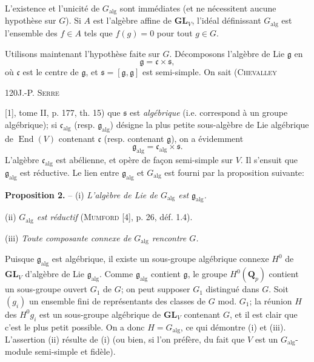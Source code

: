 L'existence et l'unicité de $G_{\mathrm{alg}}$ sont immédiates (et ne nécessitent aucune hypothèse sur $G$). Si $A$ est l'algèbre affine de $\mathbf{GL}_V$, l'idéal définissant $G_{\mathrm{alg}}$ est l'ensemble des $f\in A$ tels que $f(g)=0$ pour tout $g\in G$.

Utilisons maintenant l'hypothèse faite sur $G$. Décomposons l'algèbre de Lie $\mathfrak g$ en
\[
\mathfrak g=\mathfrak c\times\mathfrak s,
\]
où $\mathfrak c$ est le centre de $\mathfrak g$, et $\mathfrak s=[\mathfrak g,\mathfrak g]$ est semi-simple. On sait (\textsc{Chevalley}

120\hfill J.-P. \textsc{Serre}

[1], tome II, p. 177, th. 15) que $\mathfrak s$ est \textit{algébrique} (i.e. correspond à un groupe algébrique); si $\mathfrak c_{\mathrm{alg}}$ (resp. $\mathfrak g_{\mathrm{alg}}$) désigne la plus petite sous-algèbre de Lie algébrique de $\operatorname{End}(V)$ contenant $\mathfrak c$ (resp. contenant $\mathfrak g$), on a évidemment
\[
\mathfrak g_{\mathrm{alg}}=\mathfrak c_{\mathrm{alg}}\times\mathfrak s.
\]
L'algèbre $\mathfrak c_{\mathrm{alg}}$ est abélienne, et opère de façon semi-simple sur $V$. Il s'ensuit que $\mathfrak g_{\mathrm{alg}}$ est réductive. Le lien entre $\mathfrak g_{\mathrm{alg}}$ et $G_{\mathrm{alg}}$ est fourni par la proposition suivante:

\textbf{Proposition 2.} -- (i) \textit{L'algèbre de Lie de $G_{\mathrm{alg}}$ est $\mathfrak g_{\mathrm{alg}}$.}

(ii) \textit{$G_{\mathrm{alg}}$ est réductif} (\textsc{Mumford} [4], p. 26, déf. 1.4).

(iii) \textit{Toute composante connexe de $G_{\mathrm{alg}}$ rencontre $G$.}

Puisque $\mathfrak g_{\mathrm{alg}}$ est algébrique, il existe un sous-groupe algébrique connexe $H^0$ de $\mathbf{GL}_V$ d'algèbre de Lie $\mathfrak g_{\mathrm{alg}}$. Comme $\mathfrak g_{\mathrm{alg}}$ contient $\mathfrak g$, le groupe $H^0(\mathbf Q_p)$ contient un sous-groupe ouvert $G_1$ de $G$; on peut supposer $G_1$ distingué dans $G$. Soit $(g_i)$ un ensemble fini de représentants des classes de $G$ mod. $G_1$; la réunion $H$ des $H^0g_i$ est un sous-groupe algébrique de $\mathbf{GL}_V$ contenant $G$, et il est clair que c'est le plus petit possible. On a donc $H=G_{\mathrm{alg}}$, ce qui démontre (i) et (iii). L'assertion (ii) résulte de (i) (ou bien, si l'on préfère, du fait que $V$ est un $G_{\mathrm{alg}}$-module semi-simple et fidèle).

